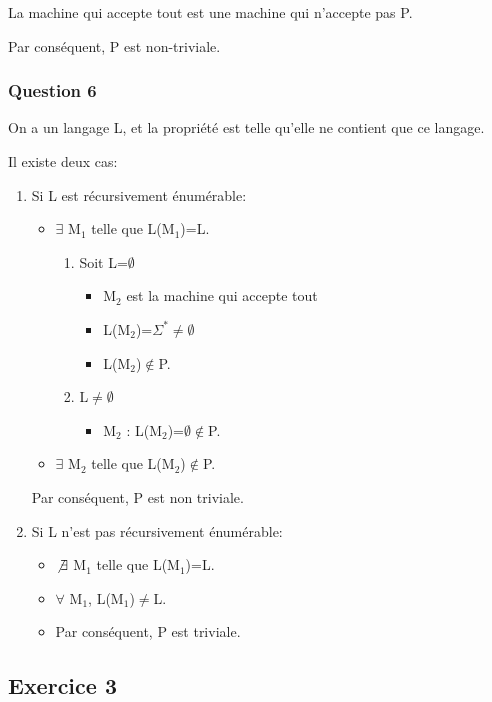 La machine qui accepte tout est une machine qui n'accepte
pas P.

Par cons\'equent, P est non-triviale.

\subsubsection{Question 6}

On a un langage L, et la propri\'et\'e est telle qu'elle
ne contient que ce langage.

Il existe deux cas:
\begin{enumerate}
  \item Si L est r\'ecursivement \'enum\'erable:
  \begin{itemize}
    \item $\exists$ M$_1$ telle que L(M$_1$)=L.
    \begin{enumerate}
      \item Soit L=$\emptyset$
      \begin{itemize}
        \item M$_2$ est la machine qui accepte tout
        \item L(M$_2$)=$\Sigma^*\neq\emptyset$
        \item L(M$_2$)$\not\in$P.
      \end{itemize}
      \item L$\neq\emptyset$
      \begin{itemize}
        \item M$_2$ : L(M$_2$)=$\emptyset\not\in$P.
      \end{itemize}
    \end{enumerate}
    \item $\exists$ M$_2$ telle que L(M$_2$)$\not\in$P.
  \end{itemize}
  Par cons\'equent, P est non triviale.
  \item Si L n'est pas r\'ecursivement \'enum\'erable:
  \begin{itemize}
    \item $\not\exists$ M$_1$ telle que L(M$_1$)=L.
    \item $\forall$ M$_1$, L(M$_1$)$\neq$L.
    \item Par cons\'equent, P est triviale.
  \end{itemize}
\end{enumerate}

\subsection{Exercice 3}

